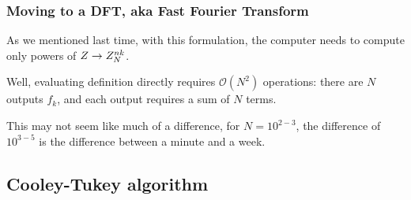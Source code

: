 \documentclass[hyperref={colorlinks=true}]{beamer}
\begin{document}
\begin{frame}%
  \frametitle{Moving to a  DFT, aka Fast Fourier Transform}

  As we mentioned last time, with this formulation, the computer needs to compute only powers of $Z \rightarrow Z_{N}^{nk}$. 
  
  \mysp
  
  \begin{center}  \end{center}
  
  \pause
  
  \mysp
  
  Well, evaluating  definition directly requires $\mathcal{O}(N^2)$ operations: there are $N$ outputs $f_k$, and each output requires a sum of $N$ terms. 
  
  \pause
  
  \mysp
  
  \begin{center}  \end{center}
  
  \pause
  
  \mysp
  
  This may not seem like much of a difference, for $N = 10^{2-3}$, the difference of $10^{3-5}$ is the difference between a minute and a week. 
  
  \begin{center}  \end{center}

\end{frame}

\subsection[Cooley-Tukey algorithm]{Cooley-Tukey algorithm}
\end{document}
